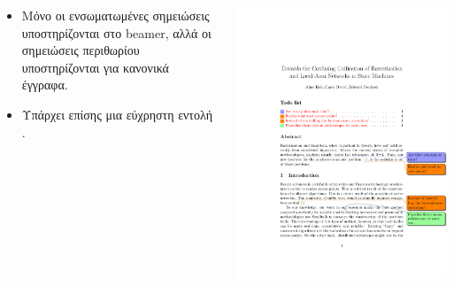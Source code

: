 \documentclass{beamer}
\begin{document}
\begin{frame}[fragile]{\insertsection}
\begin{columns}
  \begin{column}{0.4\textwidth}
    \begin{itemize}
    \item Μόνο οι ενσωματωμένες σημειώσεις υποστηρίζονται στο \en beamer\gr, αλλά οι σημειώσεις περιθωρίου υποστηρίζονται για κανονικά έγγραφα.
    \item Υπάρχει επίσης μια εύχρηστη εντολή \en {}\gr.
    \end{itemize}
  \end{column}
  \begin{column}{0.6\textwidth}
    \includegraphics[width=\textwidth,page=1]{todonotes-example}
  \end{column}
\end{columns}
\end{frame}

\end{document}
